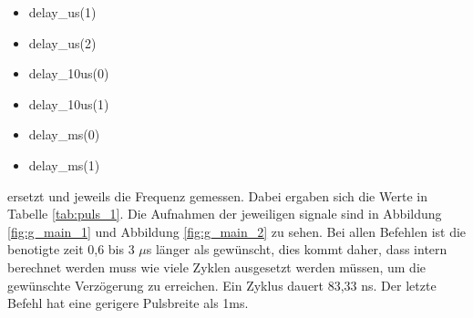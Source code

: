 \documentclass[12pt,a4paper]{article}
\begin{document}
\begin{itemize}
\item	delay\_us(1)

\item	delay\_us(2)

\item	delay\_10us(0)

\item	delay\_10us(1)

\item	delay\_ms(0)

\item	delay\_ms(1)
\end{itemize}

ersetzt und jeweils die Frequenz gemessen. Dabei ergaben sich die Werte in Tabelle \ref{tab:puls_1}. Die Aufnahmen der jeweiligen signale sind in Abbildung \ref{fig:g_main_1} und Abbildung \ref{fig:g_main_2} zu sehen. Bei allen Befehlen ist die benotigte zeit 0,6 bis 3 $\mu$s länger als gewünscht, dies kommt daher, dass intern berechnet werden muss wie viele Zyklen ausgesetzt werden müssen, um die gewünschte Verzögerung zu erreichen. Ein Zyklus dauert 83,33 ns. Der letzte Befehl hat eine gerigere Pulsbreite als 1ms.
\end{document}
